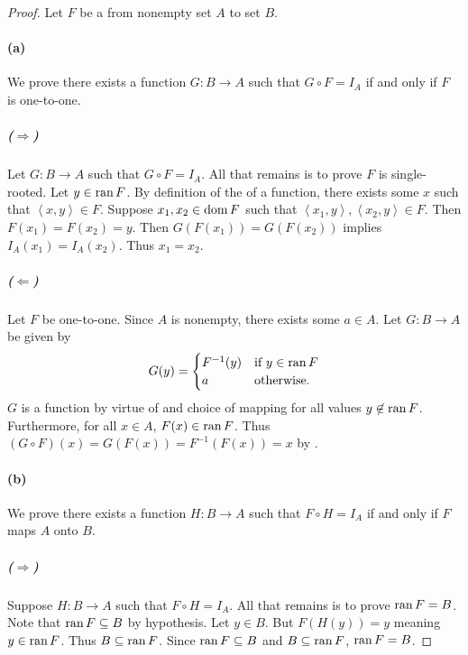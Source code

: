 \documentclass{report}
\begin{document}
\begin{proof}

  Let $F$ be a  from nonempty set $A$ to set $B$.

  \paragraph{(a)}%

    We prove there exists a function $G \colon B \rightarrow A$ such that
      $G \circ F = I_A$ if and only if $F$ is one-to-one.

    \subparagraph{($\Rightarrow$)}%

      Let $G \colon B \rightarrow A$ such that $G \circ F = I_A$.
      All that remains is to prove $F$ is single-rooted.
      Let $y \in \mathop{\text{ran}}{F}$.
      By definition of the  of a function, there exists some
        $x$ such that $\left< x, y \right> \in F$.
      Suppose $x_1, x_2 \in \mathop{\text{dom}}{F}$ such that
        $\left< x_1, y \right>, \left< x_2, y \right> \in F$.
      Then $F(x_1) = F(x_2) = y$.
      Then $G(F(x_1)) = G(F(x_2))$ implies $I_A(x_1) = I_A(x_2)$.
      Thus $x_1 = x_2$.

    \subparagraph{($\Leftarrow$)}%

      Let $F$ be one-to-one.
      Since $A$ is nonempty, there exists some $a \in A$.
      Let $G \colon B \rightarrow A$ be given by
        $$G(y) = \begin{cases}
          F^{-1}(y) & \text{if } y \in \mathop{\text{ran}}{F} \\
          a & \text{otherwise}.
        \end{cases}$$
      $G$ is a function by virtue of  and choice of mapping
        for all values $y \not\in \mathop{\text{ran}}{F}$.
      Furthermore, for all $x \in A$, $F(x) \in \mathop{\text{ran}}{F}$.
      Thus $(G \circ F)(x) = G(F(x)) = F^{-1}(F(x)) = x$ by
        .

  \paragraph{(b)}%

    We prove there exists a function $H \colon B \rightarrow A$ such that
      $F \circ H = I_A$ if and only if $F$ maps $A$ onto $B$.

    \subparagraph{($\Rightarrow$)}%

      Suppose $H \colon B \rightarrow A$ such that $F \circ H = I_A$.
      All that remains is to prove $\mathop{\text{ran}}{F} = B$.
      Note that $\mathop{\text{ran}}{F} \subseteq B$ by hypothesis.
      Let $y \in B$.
      But $F(H(y)) = y$ meaning $y \in \mathop{\text{ran}}{F}$.
      Thus $B \subseteq \mathop{\text{ran}}{F}$.
      Since $\mathop{\text{ran}}{F} \subseteq B$ and $B \subseteq \mathop{\text{ran}}{F}$, $\mathop{\text{ran}}{F} = B$.


\end{proof}
\end{document}
